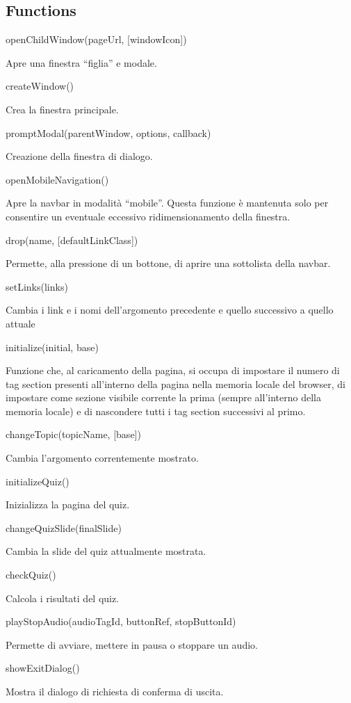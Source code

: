 \hypertarget{functions}{%
\subsection{Functions}\label{functions}}

openChildWindow(pageUrl, {[}windowIcon{]})

Apre una finestra ``figlia'' e modale.

createWindow()

Crea la finestra principale.

promptModal(parentWindow, options, callback)

Creazione della finestra di dialogo.

openMobileNavigation()

Apre la navbar in modalità ``mobile''. Questa funzione è mantenuta solo
per consentire un eventuale eccessivo ridimensionamento della finestra.

drop(name, {[}defaultLinkClass{]})

Permette, alla pressione di un bottone, di aprire una sottolista della
navbar.

setLinks(links)

Cambia i link e i nomi dell'argomento precedente e quello successivo a
quello attuale

initialize(initial, base)

Funzione che, al caricamento della pagina, si occupa di impostare il
numero di tag section presenti all'interno della pagina nella memoria
locale del browser, di impostare come sezione visibile corrente la prima
(sempre all'interno della memoria locale) e di nascondere tutti i tag
section successivi al primo.

changeTopic(topicName, {[}base{]})

Cambia l'argomento correntemente mostrato.

initializeQuiz()

Inizializza la pagina del quiz.

changeQuizSlide(finalSlide)

Cambia la slide del quiz attualmente mostrata.

checkQuiz()

Calcola i risultati del quiz.

playStopAudio(audioTagId, buttonRef, stopButtonId)

Permette di avviare, mettere in pausa o stoppare un audio.

showExitDialog()

Mostra il dialogo di richiesta di conferma di uscita.

